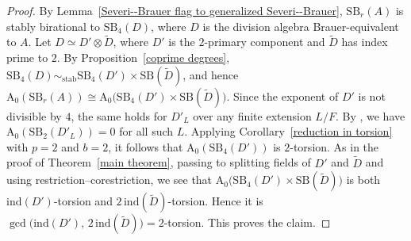 \documentclass[10pt]{amsart}
\theoremstyle{plain}
\theoremstyle{definition}
\begin{document}
\begin{proof}
By Lemma~\ref{Severi--Brauer flag to generalized Severi--Brauer}, \(\mathrm{SB}_r(A)\) is stably birational to \(\mathrm{SB}_4(D)\), where \(D\) is the division algebra Brauer-equivalent to \(A\). Let \(D \simeq D' \otimes \tilde{D}\), where \(D'\) is the \(2\)-primary component and \(\tilde{D}\) has index prime to \(2\). By Proposition~\ref{coprime degrees}, \(\mathrm{SB}_4(D) \sim_{\mathrm{stab}} \mathrm{SB}_4(D') \times \mathrm{SB}(\tilde{D})\), and hence \(\mathrm{A_0}(\mathrm{SB}_r(A)) \cong \mathrm{A_0}\bigl(\mathrm{SB}_4(D') \times \mathrm{SB}(\tilde{D})\bigr)\).
Since the exponent of \(D'\) is not divisible by \(4\), the same holds for \(D'_L\) over any finite extension \(L/F\). By \cite[Corollary~8.4]{MC}, we have \(\mathrm{A_0}(\mathrm{SB}_2(D'_L))=0\) for all such \(L\). Applying Corollary~\ref{reduction in torsion} with \(p=2\) and \(b=2\), it follows that \(\mathrm{A_0}(\mathrm{SB}_4(D'))\) is \(2\)-torsion.
As in the proof of Theorem~\ref{main theorem}, passing to splitting fields of \(D'\) and \(\tilde{D}\) and using restriction--corestriction, we see that 
\(\mathrm{A_0}\bigl(\mathrm{SB}_4(D') \times \mathrm{SB}(\tilde{D})\bigr)\)
is both \(\mathrm{ind}(D')\)-torsion and \(2\,\mathrm{ind}(\tilde{D})\)-torsion. Hence it is \(\gcd\bigl(\mathrm{ind}(D'),\, 2\,\mathrm{ind}(\tilde{D})\bigr)=2\)-torsion. This proves the claim.
\end{proof}
\end{document}
